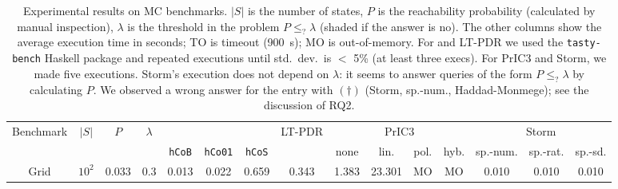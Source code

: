 \begin{table}
	\caption{\small Experimental results on MC benchmarks.
		$|S|$ is the number of states, $P$ is the reachability probability (calculated by manual inspection), $\lambda$ is the threshold in the problem $P\le_{?} \lambda$ (shaded if the answer is no). The other columns show the average execution time in seconds; TO is timeout (\SI{900}{\second}); MO is out-of-memory.
		For \ADPDR{} and LT-PDR we used the \texttt{tasty-bench} Haskell package and repeated executions until std.\ dev.\ is $<$ 5\% (at least three execs). For PrIC3 and Storm, we made five executions. Storm's execution does not depend on $\lambda$: it seems to answer queries of the form $P\le_{?} \lambda$ by calculating $P$. We observed a wrong answer for the entry with $(\dagger)$ (Storm, sp.-num., Haddad-Monmege); see the discussion of RQ2.
	}
	\label{tb:pdr:mc}
	\centering
	\begin{lrbox}{\lstbox}\begin{minipage}{\textheight}
			\begin{tabular}{ccccccccccccccc}
				\toprule
				Benchmark                                      & $|S|$                      &
				$P$
				                                               & $\lambda$
				                                               & \multicolumn{3}{c}{\ADPDR}
				                                               &                                                                                                                                                                                                                                                                          %
				LT-PDR
				                                               & \multicolumn{4}{c}{PrIC3}
				                                               & \multicolumn{3}{c}{Storm}
				\\\cmidrule(lr){5-7} \cmidrule(lr){9-12} \cmidrule(lr){13-15}
				                                               &                            &                           &                          & \verb|hCoB| & \verb|hCo01| & \verb|hCoS|
				                                               &                            & none                      & lin.                     & pol.        & hyb.         & sp.-num.    & sp.-rat. & sp.-sd.                                                                                                                        \\
				\midrule\midrule
				\multirow{4}{*}{Grid}                          & \multirow{2}{*}{$10^2$}    & \multirow{2}{*}{0.033}    & 0.3                      & 0.013       & 0.022        & 0.659       & 0.343    & 1.383   & 23.301  & MO      & MO      & \multirow{2}{*}{0.010}             & \multirow{2}{*}{0.010}   & \multirow{2}{*}{0.010} \\

\end{tabular}
\end{minipage}
\end{lrbox}
\end{table}

